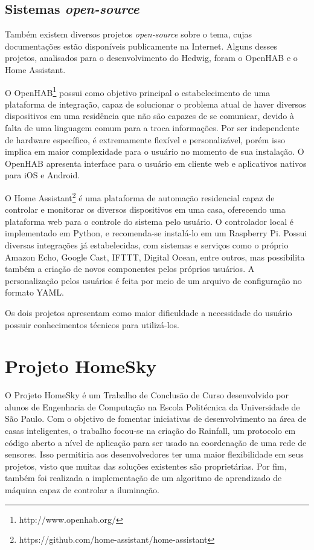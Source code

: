 \subsection{Sistemas \emph{open-source}}
Também existem diversos projetos \emph{open-source} sobre o tema, cujas documentações estão disponíveis publicamente na Internet. Alguns desses projetos, analisados para o desenvolvimento do Hedwig, foram o OpenHAB e o Home Assistant.

O OpenHAB\footnote{http://www.openhab.org/} possui como objetivo principal o estabelecimento de uma plataforma de integração, capaz de solucionar o problema atual de haver diversos dispositivos em uma residência que não são capazes de se comunicar, devido à falta de uma linguagem comum para a troca informações. Por ser independente de hardware específico, é extremamente flexível e personalizável, porém isso implica em maior complexidade para o usuário no momento de sua instalação. O OpenHAB apresenta interface para o usuário em cliente web e aplicativos nativos para iOS e Android.

O Home Assistant\footnote{https://github.com/home-assistant/home-assistant} é uma plataforma de automação residencial capaz de controlar e monitorar os diversos dispositivos em uma casa, oferecendo uma plataforma web para o controle do sistema pelo usuário. O controlador local é implementado em Python, e recomenda-se instalá-lo em um Raspberry Pi. Possui diversas integrações já estabelecidas, com sistemas e serviços como o próprio Amazon Echo, Google Cast, IFTTT, Digital Ocean, entre outros, mas possibilita também a criação de novos componentes pelos próprios usuários. A personalização pelos usuários é feita por meio de um arquivo de configuração no formato YAML.

Os dois projetos apresentam como maior dificuldade a necessidade do usuário possuir conhecimentos técnicos para utilizá-los.

\section{Projeto HomeSky}

O Projeto HomeSky \cite{homeSky} é um Trabalho de Conclusão de Curso desenvolvido por alunos de Engenharia de Computação na Escola Politécnica da Universidade de São Paulo. Com o objetivo de fomentar iniciativas de desenvolvimento na área de casas inteligentes, o trabalho focou-se na criação do Rainfall, um protocolo em código aberto a nível de aplicação para ser usado na coordenação de uma rede de sensores. Isso permitiria aos desenvolvedores ter uma maior flexibilidade em seus projetos, visto que muitas das soluções existentes são proprietárias. Por fim, também foi realizada a implementação de um algoritmo de aprendizado de máquina capaz de controlar a iluminação.

